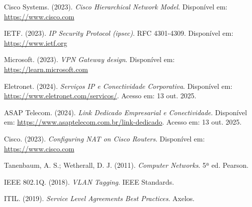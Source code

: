 \documentclass[a4paper, 12pt]{article}
\begin{document}
\begin{thebibliography}{9}

Cisco Systems. (2023). \emph{Cisco Hierarchical Network Model}.
Disponível em: \url{https://www.cisco.com}

IETF. (2023). \emph{IP Security Protocol (ipsec)}. RFC 4301-4309.
Disponível em: \url{https://www.ietf.org}

Microsoft. (2023). \emph{VPN Gateway design}.
Disponível em: \url{https://learn.microsoft.com}

Eletronet. (2024). \emph{Serviços IP e Conectividade Corporativa}.
Disponível em: \url{https://www.eletronet.com/servicos/}. Acesso em: 13 out. 2025.

ASAP Telecom. (2024). \emph{Link Dedicado Empresarial e Conectividade}.
Disponível em: \url{https://www.asaptelecom.com.br/link-dedicado}. Acesso em: 13 out. 2025.

Cisco. (2023). \emph{Configuring NAT on Cisco Routers}.
Disponível em: \url{https://www.cisco.com}

Tanenbaum, A. S.; Wetherall, D. J. (2011). \emph{Computer Networks}. 5ª ed. Pearson.

IEEE 802.1Q. (2018). \emph{VLAN Tagging}. IEEE Standards.

ITIL. (2019). \emph{Service Level Agreements Best Practices}. Axelos.

\end{thebibliography}
\end{document}
